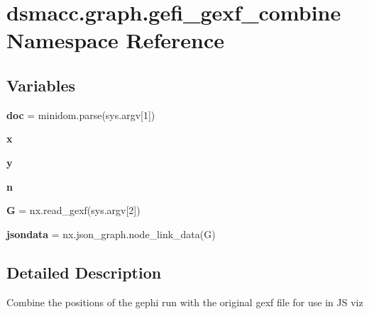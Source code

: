 \hypertarget{namespacedsmacc_1_1graph_1_1gefi__gexf__combine}{}\section{dsmacc.\+graph.\+gefi\+\_\+gexf\+\_\+combine Namespace Reference}
\label{namespacedsmacc_1_1graph_1_1gefi__gexf__combine}
\subsection*{Variables}
\begin{DoxyCompactItemize}
\item 
\mbox{\label{namespacedsmacc_1_1graph_1_1gefi__gexf__combine_aa40b54f3b010bcebd77f5577ddbc42cc}} 
{\bfseries doc} = minidom.\+parse(sys.\+argv\mbox{[}1\mbox{]})
\item 
\mbox{\label{namespacedsmacc_1_1graph_1_1gefi__gexf__combine_a6408b21e4cf5bd8718c5edbd4cc32941}} 
{\bfseries x}
\item 
\mbox{\label{namespacedsmacc_1_1graph_1_1gefi__gexf__combine_ae55362ce5513159d3b41f4997d907ccf}} 
{\bfseries y}
\item 
\mbox{\label{namespacedsmacc_1_1graph_1_1gefi__gexf__combine_ac28861f119eb819b8bae9fb5ac6505f0}} 
{\bfseries n}
\item 
\mbox{\label{namespacedsmacc_1_1graph_1_1gefi__gexf__combine_a4117023110fb72612dfb74fdcd3a3076}} 
{\bfseries G} = nx.\+read\+\_\+gexf(sys.\+argv\mbox{[}2\mbox{]})
\item 
\mbox{\label{namespacedsmacc_1_1graph_1_1gefi__gexf__combine_ae5c4ec85fc32bfe414241eeb3adbbbf6}} 
{\bfseries jsondata} = nx.\+json\+\_\+graph.\+node\+\_\+link\+\_\+data(G)
\end{DoxyCompactItemize}


\subsection{Detailed Description}
\begin{DoxyVerb}Combine the positions of the gephi run with the original gexf file
for use in JS viz
\end{DoxyVerb}
 